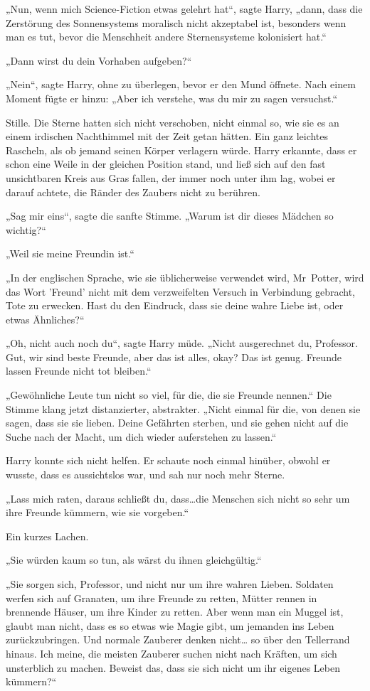 {„Nun, wenn mich Science-Fiction etwas gelehrt hat“, sagte Harry, „dann, dass die Zerstörung des Sonnensystems moralisch nicht akzeptabel ist, besonders wenn man es tut, bevor die Menschheit andere Sternensysteme kolonisiert hat.“

„Dann wirst du dein Vorhaben aufgeben?“

„Nein“, sagte Harry, ohne zu überlegen, bevor er den Mund öffnete. Nach einem Moment fügte er hinzu: „Aber ich verstehe, was du mir zu sagen versuchst.“

Stille. Die Sterne hatten sich nicht verschoben, nicht einmal so, wie sie es an einem irdischen Nachthimmel mit der Zeit getan hätten. Ein ganz leichtes Rascheln, als ob jemand seinen Körper verlagern würde. Harry erkannte, dass er schon eine Weile in der gleichen Position stand, und ließ sich auf den fast unsichtbaren Kreis aus Gras fallen, der immer noch unter ihm lag, wobei er darauf achtete, die Ränder des Zaubers nicht zu berühren.

„Sag mir eins“, sagte die sanfte Stimme. „Warum ist dir dieses Mädchen so wichtig?“

„Weil sie meine Freundin ist.“

„In der englischen Sprache, wie sie üblicherweise verwendet wird, Mr~Potter, wird das Wort 'Freund' nicht mit dem verzweifelten Versuch in Verbindung gebracht, Tote zu erwecken. Hast du den Eindruck, dass sie deine wahre Liebe ist, oder etwas Ähnliches?“

„Oh, nicht auch noch du“, sagte Harry müde. „Nicht ausgerechnet du, Professor. Gut, wir sind beste Freunde, aber das ist alles, okay? Das ist genug. Freunde lassen Freunde nicht tot bleiben.“

„Gewöhnliche Leute tun nicht so viel, für die, die sie Freunde nennen.“ Die Stimme klang jetzt distanzierter, abstrakter. „Nicht einmal für die, von denen sie sagen, dass sie sie lieben. Deine Gefährten sterben, und sie gehen nicht auf die Suche nach der Macht, um dich wieder auferstehen zu lassen.“

Harry konnte sich nicht helfen. Er schaute noch einmal hinüber, obwohl er wusste, dass es aussichtslos war, und sah nur noch mehr Sterne.

„Lass mich raten, daraus schließt du, dass…die Menschen sich nicht so sehr um ihre Freunde kümmern, wie sie vorgeben.“

Ein kurzes Lachen.

„Sie würden kaum so tun, als wärst du ihnen gleichgültig.“

„Sie sorgen sich, Professor, und nicht nur um ihre wahren Lieben. Soldaten werfen sich auf Granaten, um ihre Freunde zu retten, Mütter rennen in brennende Häuser, um ihre Kinder zu retten. Aber wenn man ein Muggel ist, glaubt man nicht, dass es so etwas wie Magie gibt, um jemanden ins Leben zurückzubringen. Und normale Zauberer denken nicht… so über den Tellerrand hinaus. Ich meine, die meisten Zauberer suchen nicht nach Kräften, um sich unsterblich zu machen. Beweist das, dass sie sich nicht um ihr eigenes Leben kümmern?“

}
